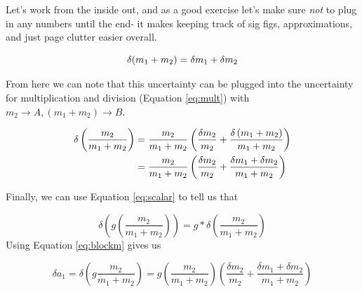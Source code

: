 \documentclass{article}
\begin{document}
\begin{example}
    Let's work from the inside out, and as a good exercise let's make sure \emph{not} to plug in any numbers until the end- it makes keeping track of sig figs, approximations, and just page clutter easier overall.

    \begin{equation}
      \delta(m_1+m_2) = \delta m_1 + \delta m_2\notag
    \end{equation}

    From here we can note that this uncertainty can be plugged into the uncertainty for multiplication and division (Equation \eqref{eq:mult}) with $m_2 \rightarrow A, \left(m_1+m_2\right) \rightarrow B$.

    \begin{align}
      \delta\left(\frac{m_2}{m_1+m_2}\right)&=\frac{m_2}{m_1+m_2}\left(\frac{\delta m_2}{m_2} + \frac{\delta \left(m_1 + m_2\right)}{m_1+m_2}\right)\notag\\
      &=\frac{m_2}{m_1+m_2}\left(\frac{\delta m_2}{m_2} + \frac{\delta m_1 + \delta m_2}{m_1+m_2}\right)\label{eq:blockm}
    \end{align}

    Finally, we can use Equation \eqref{eq:scalar} to tell us that

    \begin{equation}
      \delta\left(g\left(\frac{m_2}{m_1+m_2}\right)\right)=g*\delta\left(\frac{m_2}{m_1+m_2}\right)
    \end{equation}
    Using Equation \eqref{eq:blockm} gives us

    \begin{equation}
      \delta a_1 = \delta\left(g\frac{m_2}{m_1+m_2}\right) =g\left(\frac{m_2}{m_1+m_2}\right)\left(\frac{\delta m_2}{m_2} + \frac{\delta m_1 + \delta m_2}{m_1+m_2}\right)\label{eq:blounc}
    \end{equation}

  \end{example}
\end{document}
